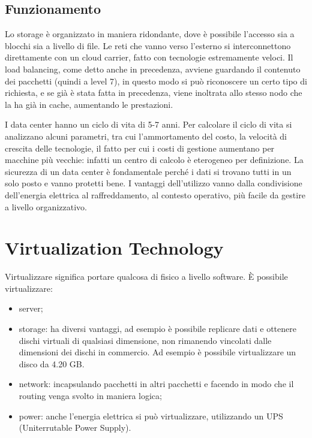\subsection{Funzionamento}
Lo storage è organizzato in maniera ridondante, dove è possibile l'accesso sia a blocchi sia a livello di file. Le reti che vanno verso l'esterno si interconnettono direttamente con un cloud carrier, fatto con tecnologie estremamente veloci. Il load balancing, come detto anche in precedenza, avviene guardando il contenuto dei pacchetti (quindi a level 7), in questo modo si può riconoscere un certo tipo di richiesta, e se già è stata fatta in precedenza, viene inoltrata allo stesso nodo che la ha già in cache, aumentando le prestazioni.

\vspace{5mm}

I data center hanno un ciclo di vita di 5-7 anni. Per calcolare il ciclo di vita si analizzano alcuni parametri, tra cui l'ammortamento del costo, la velocità di crescita delle tecnologie, il fatto per cui i costi di gestione aumentano per macchine più vecchie: infatti un centro di calcolo è eterogeneo per definizione. La sicurezza di un data center è fondamentale perché i dati si trovano tutti in un solo posto e vanno protetti bene. I vantaggi dell'utilizzo vanno dalla condivisione dell'energia elettrica al raffreddamento, al contesto operativo, più facile da gestire a livello organizzativo.

\section{Virtualization Technology}
Virtualizzare significa portare qualcosa di fisico a livello software. È possibile virtualizzare:
\begin{itemize}
    \item server;
    \item storage: ha diversi vantaggi, ad esempio è possibile replicare dati e ottenere dischi virtuali di qualsiasi dimensione, non rimanendo vincolati dalle dimensioni dei dischi in commercio. Ad esempio è possibile virtualizzare un disco da 4.20 GB.
    \item network: incapsulando pacchetti in altri pacchetti e facendo in modo che il routing venga svolto in maniera logica;
    \item power: anche l'energia elettrica si può virtualizzare, utilizzando un UPS (Uniterrutable Power Supply).
\end{itemize}

